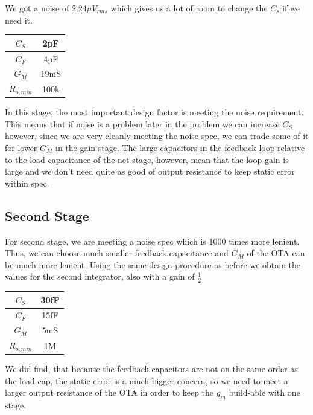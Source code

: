 \documentclass[conference]{IEEEtran}
\begin{document}
We got a noise of $2.24\mu V_{rms}$ which gives us a lot of room to change the $C_s$ if we need it.

\begin{center}
\begin{tabular}{|c|c|} 
\hline
$C_S$ & 2pF \\
\hline
$C_F$ & 4pF \\
\hline
$G_M$ & 19mS \\
\hline
$R_{o,min}$ & 100k \\
\hline
\end{tabular}
\end{center}

In this stage, the most important design factor is meeting the noise requirement. This means that if noise is a problem later in the problem we can increase $C_S$ however, since we are very cleanly meeting the noise spec, we can trade some of it for lower $G_M$ in the gain stage. The large capacitors in the feedback loop relative to the load capacitance of the net stage, however, mean that the loop gain is large and we don't need quite as good of output resistance to keep static error within spec.

\subsection{Second Stage}

For second stage, we are meeting a noise spec which is 1000 times more lenient. Thus, we can choose much smaller feedback capacitance and $G_M$ of the OTA can be much more lenient. Using the same design procedure as before we obtain the values for the second integrator, also with a gain of $\frac{1}{2}$

\begin{center}
\begin{tabular}{|c|c|} 
\hline
$C_S$ & 30fF \\
\hline
$C_F$ & 15fF \\
\hline
$G_M$ & 5mS \\
\hline
$R_{o,min}$ & 1M \\
\hline
\end{tabular}
\end{center}


We did find, that because the feedback capacitors are not on the same order as the load cap, the static error is a much bigger concern, so we need to meet a larger output resistance of the OTA in order to keep the $g_m$ build-able with one stage.
\end{document}

